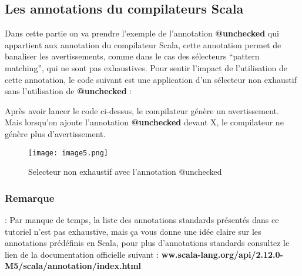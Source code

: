 \documentclass[runningheads]{llncs}
\begin{document}
\subsection{Les annotations du compilateurs Scala}
Dans cette partie on va prendre l’exemple de l’annotation \textbf{@unchecked} qui appartient aux annotation du compilateur Scala, cette annotation permet de banaliser les avertissements, comme dans le cas des sélecteurs “pattern matching”, qui ne sont pas exhaustives. 
Pour sentir l’impact de l'utilisation de cette annotation, le code suivant est une application d’un sélecteur non exhaustif sans l’utilisation de \textbf{@unchecked} :



Après avoir lancer le code ci-dessus, le compilateur génère un avertissement.\\



Mais lorsqu’on ajoute l’annotation \textbf{@unchecked} devant X, le compilateur ne génère plus d'avertissement.

\begin{figure}
\texttt{[image: image5.png]}
\caption{Selecteur non exhaustif avec l’annotation @unchecked} \label{fig4}
\end{figure}


\subsubsection{Remarque } 
   :\newline
Par manque de temps, la liste des annotations standards présentés dans ce tutoriel n'est pas exhaustive, mais ça vous donne une idée claire sur les annotations prédéfinis en Scala, pour plus  d’annotations standards consultez le lien de la documentation officielle suivant :\newline\newline
\textbf{ww.scala-lang.org/api/2.12.0-M5/scala/annotation/index.html}
\end{document}
